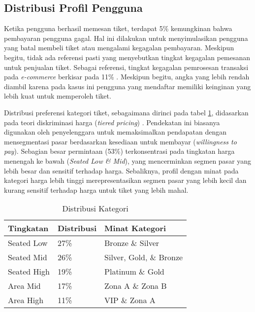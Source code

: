 \subsection{Distribusi Profil Pengguna}

Ketika pengguna berhasil memesan tiket, terdapat 5\% kemungkinan bahwa pembayaran pengguna gagal. Hal ini dilakukan untuk menyimulasikan pengguna yang batal membeli tiket atau mengalami kegagalan pembayaran. Meskipun begitu, tidak ada referensi pasti yang menyebutkan tingkat kegagalan pemesanan untuk penjualan tiket. Sebagai referensi, tingkat kegagalan pemrosesan transaksi pada \textit{e-commerce} berkisar pada 11\% \parencite{paymentFail}. Meskipun begitu, angka yang lebih rendah diambil karena pada kasus ini pengguna yang mendaftar memiliki keinginan yang lebih kuat untuk memperoleh tiket.

Distribusi preferensi kategori tiket, sebagaimana dirinci pada tabel \ref{table:distribusi-kategori}, didasarkan pada teori diskriminasi harga (\textit{tiered pricing}) \parencite{acei2022}. Pendekatan ini biasanya digunakan oleh penyelenggara untuk memaksimalkan pendapatan dengan mensegmentasi pasar berdasarkan kesediaan untuk membayar (\textit{willingness to pay}). Sebagian besar permintaan (53\%) terkonsentrasi pada tingkatan harga menengah ke bawah (\textit{Seated Low \& Mid}), yang mencerminkan segmen pasar yang lebih besar dan sensitif terhadap harga. Sebaliknya, profil dengan minat pada kategori harga lebih tinggi merepresentasikan segmen pasar yang lebih kecil dan kurang sensitif terhadap harga untuk tiket yang lebih mahal.

\begin{table}[h]
    \centering
    \caption{Distribusi Kategori}
    \label{table:distribusi-kategori}
    \begin{tabular}{|l|l|l|}
        \hline
        \textbf{Tingkatan} & \textbf{Distribusi} & \textbf{Minat Kategori} \\
        \hline
        Seated Low         & 27\%                & Bronze \& Silver        \\
        \hline
        Seated Mid         & 26\%                & Silver, Gold, \& Bronze \\
        \hline
        Seated High        & 19\%                & Platinum \& Gold        \\
        \hline
        Area Mid           & 17\%                & Zona A \& Zona B        \\
        \hline
        Area High          & 11\%                & VIP \& Zona A           \\
        \hline
    \end{tabular}
\end{table}

